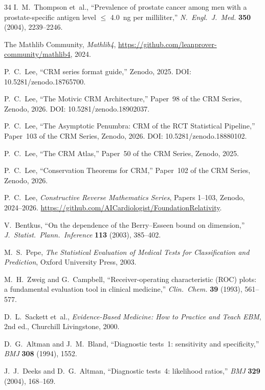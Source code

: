 \documentclass[11pt,a4paper]{article}
\theoremstyle{plain}
\theoremstyle{definition}
\begin{document}
\begin{thebibliography}{34}
I.~M.~Thompson et~al., ``Prevalence of prostate cancer among men with a prostate-specific antigen level $\leq$ 4.0~ng per milliliter,'' \emph{N.~Engl.~J.~Med.} \textbf{350} (2004), 2239--2246.

The Mathlib Community, \emph{Mathlib4}, \url{https://github.com/leanprover-community/mathlib4}, 2024.

P.~C.~Lee, ``CRM series format guide,'' Zenodo, 2025.  DOI: 10.5281/zenodo.18765700.

P.~C.~Lee, ``The Motivic CRM Architecture,'' Paper~98 of the CRM Series, Zenodo, 2026.  DOI: 10.5281/zenodo.18902037.

P.~C.~Lee, ``The Asymptotic Penumbra: CRM of the RCT Statistical Pipeline,'' Paper~103 of the CRM Series, Zenodo, 2026.  DOI: 10.5281/zenodo.18880102.

P.~C.~Lee, ``The CRM Atlas,'' Paper~50 of the CRM Series, Zenodo, 2025.

P.~C.~Lee, ``Conservation Theorems for CRM,'' Paper~102 of the CRM Series, Zenodo, 2026.

P.~C.~Lee, \emph{Constructive Reverse Mathematics Series}, Papers 1--103, Zenodo, 2024--2026.  \url{https://github.com/AICardiologist/FoundationRelativity}.

V.~Bentkus, ``On the dependence of the Berry--Esseen bound on dimension,'' \emph{J.~Statist.~Plann.~Inference} \textbf{113} (2003), 385--402.

M.~S.~Pepe, \emph{The Statistical Evaluation of Medical Tests for Classification and Prediction}, Oxford University Press, 2003.

M.~H.~Zweig and G.~Campbell, ``Receiver-operating characteristic (ROC) plots: a fundamental evaluation tool in clinical medicine,'' \emph{Clin.~Chem.} \textbf{39} (1993), 561--577.

D.~L.~Sackett et~al., \emph{Evidence-Based Medicine: How to Practice and Teach EBM}, 2nd ed., Churchill Livingstone, 2000.

D.~G.~Altman and J.~M.~Bland, ``Diagnostic tests~1: sensitivity and specificity,'' \emph{BMJ} \textbf{308} (1994), 1552.

J.~J.~Deeks and D.~G.~Altman, ``Diagnostic tests~4: likelihood ratios,'' \emph{BMJ} \textbf{329} (2004), 168--169.


\end{thebibliography}
\end{document}
